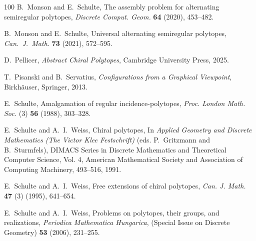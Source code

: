 \documentclass[12pt]{amsart}
\theoremstyle{definition}
\begin{document}
\begin{thebibliography}{100}
 B.~Monson and E.~Schulte, The assembly problem for alternating semiregular polytopes, \textit{Discrete Comput. Geom.} {\bf 64} (2020), 453--482.

 B.~Monson and E.~Schulte, Universal alternating semiregular polytopes, \textit{Can.\ J.\ Math.} {\bf 73} (2021), 572--595.

 D.~Pellicer, \textit{Abstract Chiral Polytopes}, Cambridge University Press, 2025.

 T.~Pisanski and B.~Servatius, \textit{Configurations from a Graphical Viewpoint}, Birkh\"{a}user, Springer, 2013.

 E.~Schulte, Amalgamation of regular incidence-polytopes, \textit{Proc. London Math. Soc.\/} (3) {\bf 56} (1988), 303--328.

 E.~Schulte and A.~I.~Weiss, Chiral polytopes, In \textit{Applied Geometry and Discrete Mathematics (The Victor Klee Festschrift)} (eds. P.~Gritzmann and B.~Sturmfels), DIMACS Series in Discrete Mathematics and Theoretical Computer Science, Vol. 4, American Mathematical Society and Association of Computing Machinery, 493--516, 1991.

 E.~Schulte and A.~I.~Weiss, Free extensions of chiral polytopes, \textit{Can. J. Math.} {\bf 47} (3) (1995), 641--654.

 E.~Schulte and A.~I.~Weiss, Problems on polytopes, their groups, and realizations, {\em Periodica Mathematica Hungarica\/}, (Special Issue on Discrete Geometry) {\bf 53}  (2006), 231--255.

\end{thebibliography}
\end{document}
